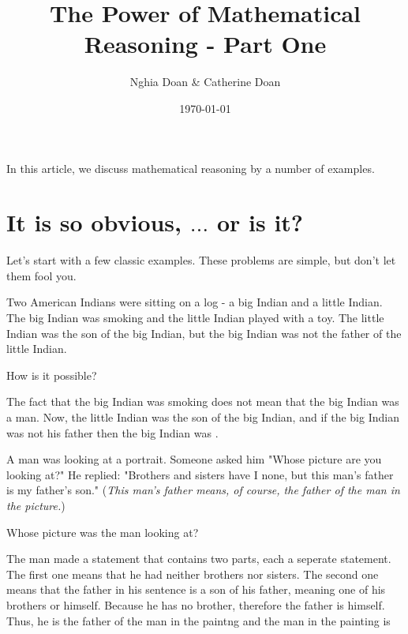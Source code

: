 \documentclass{article}
\title{The Power of Mathematical Reasoning - Part One}
\author{Nghia Doan \& Catherine Doan}
\date{\today}
\begin{document}
\maketitle

In this article, we discuss mathematical reasoning by a number of examples.

\section*{It is so obvious, $\ldots$ or is it?}

Let's start with a few classic examples.
These problems are simple, but don't let them fool you.

\begin{example*}
    \label{example:pi-2022-4-p1}
    Two American Indians were sitting on a log - a big Indian and a little Indian.
    The big Indian was smoking and the little Indian played with a toy.
    The little Indian was the son of the big Indian,
    but the big Indian was not the father of the little Indian.

    How is it possible?
\end{example*}

\begin{soln}
    The fact that the big Indian was smoking does not mean that the big Indian was a man.
    Now, the little Indian was the son of the big Indian, and if the big Indian was not his father
    then the big Indian was .
\end{soln}

\begin{example*}
    \label{example:pi-2022-4-p2}
    A man was looking at a portrait. Someone asked him "Whose picture are you looking at?"
    He replied: "Brothers and sisters have I none, but this man's father is my father's son."
    (\textit{This man's father means, of course, the father of the man in the picture.})

    Whose picture was the man looking at?
\end{example*}

\begin{soln}
    The man made a statement that contains two parts, each a seperate statement.
    The first one means that he had neither brothers nor sisters.
    The second one means that the father in his sentence is a son of his father, meaning one of his brothers or himself.
    Because he has no brother, therefore the father is himself.
    Thus, he is the father of the man in the paintng and the man in the painting is 
\end{soln}
\end{document}
